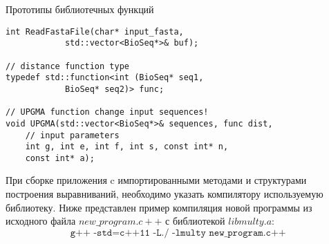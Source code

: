 \begin{algorithm}
	\caption{Прототипы библиотечных функций} \label{lst:LibHeader}
	\begin{lstlisting}
int ReadFastaFile(char* input_fasta, 
			std::vector<BioSeq*>& buf);
			
// distance function type
typedef std::function<int (BioSeq* seq1, 
			BioSeq* seq2)> func;
			
// UPGMA function change input sequences!
void UPGMA(std::vector<BioSeq*>& sequences, func dist, 
	// input parameters
	int g, int e, int f, int s, const int* n, 
	const int* a);
	\end{lstlisting}
\end{algorithm}

При сборке приложения c импортированными методами и структурами построения выравниваний, необходимо указать компилятору используемую библиотеку. Ниже представлен пример компиляция новой программы из исходного файла $new\_program.c++$ с библиотекой $libmulty.a$: 
\begin{equation*}
\texttt{g++ -std=c++11 -L./ -lmulty new\_program.c++ }
\end{equation*}